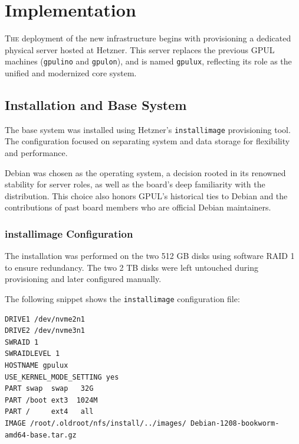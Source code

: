 %

\chapter{Implementation}
\label{chap:implementation}

\lettrine{T}{he} deployment of the new infrastructure begins with provisioning a dedicated physical server hosted at Hetzner\cite{hetzner-server-bidding}. This server replaces the previous GPUL machines (\texttt{gpulino} and \texttt{gpulon}), and is named \texttt{gpulux}, reflecting its role as the unified and modernized core system.

\section{Installation and Base System}

The base system was installed using Hetzner's \texttt{installimage}\cite{hetzner-installimage} provisioning tool. The configuration focused on separating system and data storage for flexibility and performance.

Debian was chosen as the operating system, a decision rooted in its renowned stability for server roles, as well as the board's deep familiarity with the distribution. This choice also honors GPUL's historical ties to Debian and the contributions of past board members who are official Debian maintainers\cite{berto-debian-page}.

\subsection*{installimage Configuration}

The installation was performed on the two 512 GB disks using software RAID 1 to ensure redundancy. The two 2 TB disks were left untouched during provisioning and later configured manually.

The following snippet shows the \texttt{installimage} configuration file:

\begin{lstlisting}[caption={Hetzner's installimage script for automated Debian installation on gpulux.}]
DRIVE1 /dev/nvme2n1
DRIVE2 /dev/nvme3n1
SWRAID 1
SWRAIDLEVEL 1
HOSTNAME gpulux
USE_KERNEL_MODE_SETTING yes
PART swap  swap   32G
PART /boot ext3  1024M
PART /     ext4   all
IMAGE /root/.oldroot/nfs/install/../images/ Debian-1208-bookworm-amd64-base.tar.gz
\end{lstlisting}

